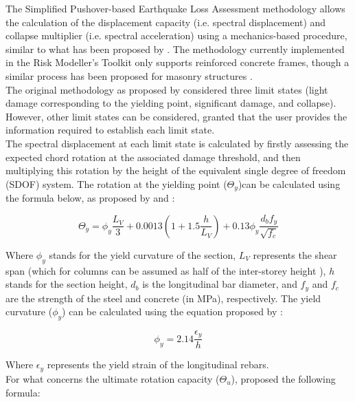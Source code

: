 The Simplified Pushover-based Earthquake Loss Assessment methodology \citep{BorziEtAl2008b} allows the calculation of the displacement capacity (i.e. spectral displacement) and collapse multiplier (i.e. spectral acceleration) using a mechanics-based procedure, similar to what has been proposed by \citet{CosenzaEtAl2005}. The methodology currently implemented in the Risk Modeller's Toolkit only supports reinforced concrete frames, though a similar process has been proposed for masonry structures \citep{BorziEtAl2008a}.\\

The original methodology as proposed by \citet{BorziEtAl2008b} considered three limit states (light damage corresponding to the yielding point, significant damage, and collapse). However, other limit states can be considered, granted that the user provides the information required to establish each limit state.\\

The spectral displacement at each limit state is calculated by firstly assessing the expected chord rotation at the associated damage threshold, and then multiplying this rotation by the height of the equivalent single degree of freedom (SDOF) system. The rotation at the yielding point ($\Theta_y$)can be calculated using the formula below, as proposed by \citet{CosenzaEtAl2005} and \citet{PanagiotakosFardis2001}:

\begin{equation}
	\Theta_y = \phi_y\frac{L_V}{3}+0.0013\left(1 + 1.5\frac{h}{L_V}\right)+0.13\phi_y\frac{d_bf_y}{\sqrt{f_c}}
\end{equation}

Where $\phi_y$ stands for the yield curvature of the section, $L_V$ represents the shear span (which for columns can be assumed as half of the inter-storey height \citep{BorziEtAl2008b}), $h$ stands for the section height, $d_b$ is the longitudinal bar diameter, and $f_y$ and $f_c$ are the strength of the steel and concrete (in MPa), respectively. The yield curvature ($\phi_y$) can be calculated using the equation proposed by \cite{PriestleyEtAl2007}:

\begin{equation}
	\phi_y = 2.14\frac{\epsilon_y}{h}
\end{equation}

Where $\epsilon_y$ represents the yield strain of the longitudinal rebars.\\

For what concerns the ultimate rotation capacity ($\Theta_u$), \cite{PanagiotakosFardis2001} proposed the following formula:

